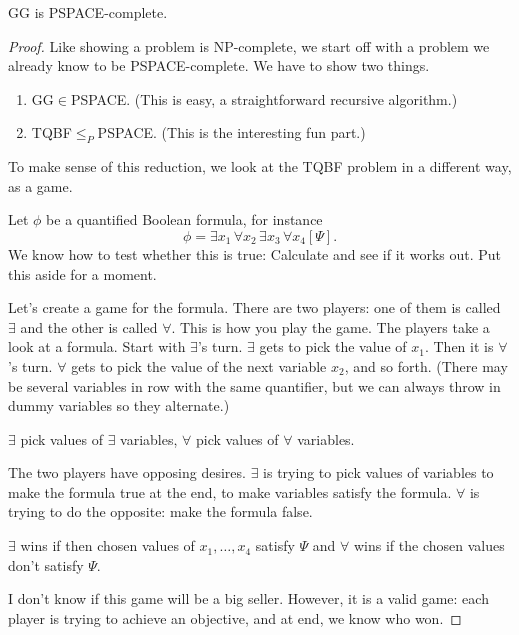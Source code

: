 \begin{thm}
GG is PSPACE-complete.
\end{thm}

\begin{proof}
Like showing a problem is NP-complete, we start off with a problem we already know to be PSPACE-complete. We have to show two things.
\begin{enumerate}
\item
GG$\in$PSPACE. (This is easy, a straightforward recursive algorithm.)
\item TQBF$\le_P$PSPACE. 
(This is the interesting fun part.)
\end{enumerate}
To make sense of this reduction, we look at the TQBF problem in a different way, as a game.

Let $\phi$ be a quantified Boolean formula, for instance
\[
\phi = \exists x_1\, \forall x_2\, \exists x_3\, \forall x_4 [\Psi].
\]
We know how to test whether this is true: Calculate and see if it works out. Put this aside for a moment.

Let's create a game for the formula. There are two players: one of them is called $\exists$ and the other is called $\forall$. This is how you play the game. The players take a look at a formula. Start with $\exists$'s turn. $\exists$ gets to pick the value of $x_1$. Then it is $\forall$'s turn. $\forall$ gets to pick the value of the next variable $x_2$, and so forth. (There may be several variables in row with the same quantifier, but we can always throw in dummy variables so they alternate.)

$\exists$ pick values of $\exists$ variables, $\forall$ pick values of $\forall$ variables. 

The two players have opposing desires. $\exists$ is trying to pick values of variables to make the formula true at the end, to make variables satisfy the formula. $\forall$ is trying to do the opposite: make the formula false. %

$\exists$ wins if then chosen values of $x_1,\ldots, x_4$ satisfy $\Psi$ and $\forall$ wins if the chosen values don't satisfy $\Psi$. 


I don't know if this game will be a big seller. However, it is a valid game: each player is trying to achieve an objective, and at end, we know who won. 


\end{proof}
